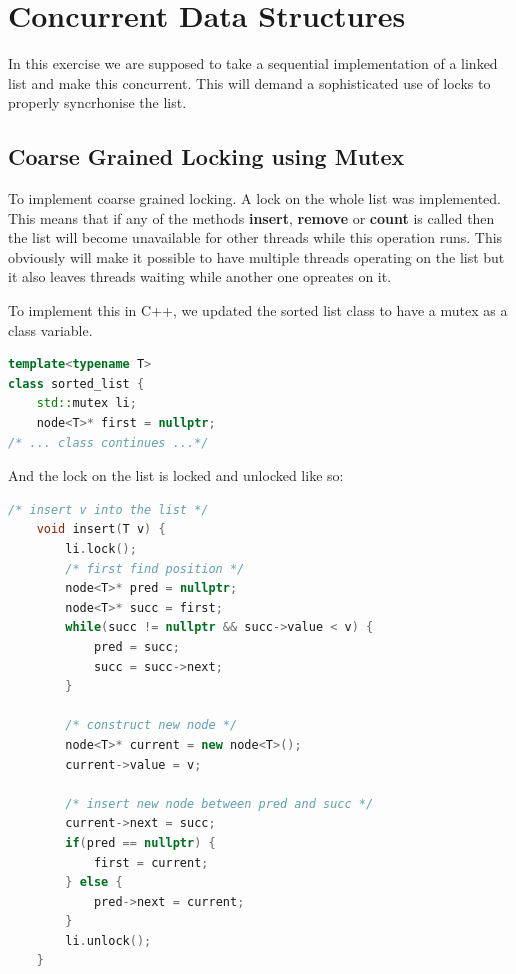 \section{Concurrent Data Structures}

In this exercise we are supposed to take a sequential implementation of a 
linked list and make this concurrent. This will demand a sophisticated use of
locks to properly syncrhonise the list.

\subsection{Coarse Grained Locking using Mutex}

To implement coarse grained locking. A lock on the whole list was implemented.
This means that if any of the methods \textbf{insert}, \textbf{remove} or 
\textbf{count} is called then the list will become unavailable for other threads while 
this operation runs. This obviously will make it possible to have multiple 
threads operating on the list but it also leaves threads waiting while another 
one opreates on it.

To implement this in C++, we updated the sorted list class to have a mutex as a
class variable.

\begin{lstlisting}[language=C++]
template<typename T>
class sorted_list {
	std::mutex li;
	node<T>* first = nullptr;
/* ... class continues ...*/
\end{lstlisting}

And the lock on the list is locked and unlocked like so:

\begin{lstlisting}[language=C++, caption=Coarse-Grained Insert]
    /* insert v into the list */
    void insert(T v) {
        li.lock();
        /* first find position */
        node<T>* pred = nullptr;
        node<T>* succ = first;
        while(succ != nullptr && succ->value < v) {
            pred = succ;
            succ = succ->next;
        }
        
        /* construct new node */
        node<T>* current = new node<T>();
        current->value = v;
    
        /* insert new node between pred and succ */
        current->next = succ;
        if(pred == nullptr) {
            first = current;
        } else {
            pred->next = current;
        }
        li.unlock();
    }
\end{lstlisting}


